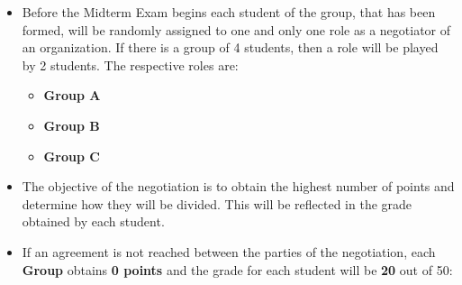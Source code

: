 \documentclass[
  ignorenonframetext,
]{beamer}
\providecommand{\tightlist}{%
  \setlength{\itemsep}{0pt}\setlength{\parskip}{0pt}}\usepackage{longtable,booktabs,array}
\begin{document}
\begin{frame}{}
\label{section-4}
\begin{itemize}
\item
  Before the Midterm Exam begins each student of the group, that has
  been formed, will be randomly assigned to one and only one role as a
  negotiator of an organization. If there is a group of 4 students, then
  a role will be played by 2 students. The respective roles are:

  \begin{itemize}
  \tightlist
  \item
    \textbf{Group A}
  \item
    \textbf{Group B}
  \item
    \textbf{Group C}
  \end{itemize}
\item
  The objective of the negotiation is to obtain the highest number of
  points and determine how they will be divided. This will be reflected
  in the grade obtained by each student.
\end{itemize}
\end{frame}

\begin{frame}{}
\label{section-5}
\begin{itemize}
\tightlist
\item
  If an agreement is not reached between the parties of the negotiation,
  each \textbf{Group} obtains \textbf{0 points} and the grade for each
  student will be \textbf{20} out of 50:
\end{itemize}

\begin{table}

\caption{\label{tbl-no-agreement}Results in case of no agreement}


\end{table}%
\end{frame}
\end{document}

